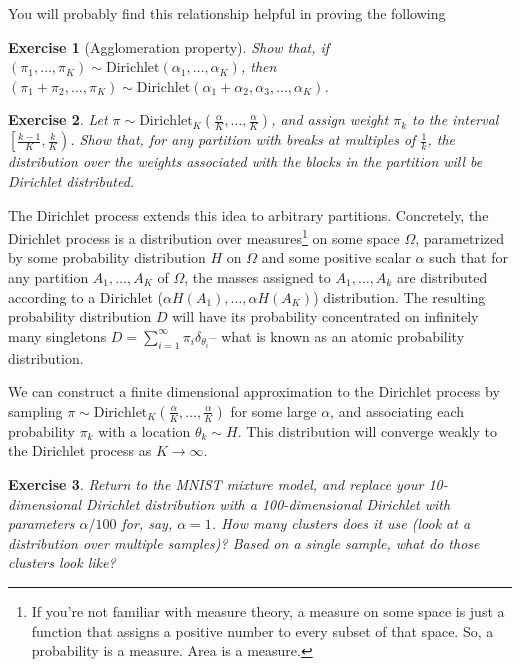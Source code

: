 \documentclass[twoside]{article}
\newcounter{lecnum}
\newtheorem{exercise}{Exercise}[lecnum]
\begin{document}
   You will probably find this relationship helpful in proving the following
   
   \begin{exercise}[Agglomeration property]
     Show that, if $(\pi_1,\dots, \pi_K) \sim \mbox{Dirichlet}(\alpha_1,\dots,\alpha_K)$, then $(\pi_1+\pi_2,\dots,\pi_K) \sim \mbox{Dirichlet}(\alpha_1+\alpha_2,\alpha_3,\dots,\alpha_K)$.
   \end{exercise}




   \begin{exercise}
     Let $\pi\sim \mbox{Dirichlet}_K\left(\frac{\alpha}{K},\dots,\frac{\alpha}{K}\right)$, and assign weight $\pi_k$ to the interval $\left[\frac{k-1}{K},\frac{k}{K}\right)$. Show that, for any partition with breaks at multiples of $\frac{1}{k}$, the distribution over the weights associated with the blocks in the partition will be Dirichlet distributed.
   \end{exercise}

   The Dirichlet process extends this idea to arbitrary partitions. Concretely, the Dirichlet process is a distribution over measures\footnote{If you're not familiar with measure theory, a measure on some space is just a function that assigns a positive number to every subset of that space. So, a probability is a measure. Area is a measure.} on some space $\mathcal{\Omega}$, parametrized by some probability distribution $H$ on $\Omega$ and some positive scalar $\alpha$ such that for any partition $A_1,\dots,A_K$ of $\Omega$, the masses assigned to $A_1,\dots, A_k$ are distributed according to a Dirichlet ($\alpha H(A_1),\dots, \alpha H(A_K)$) distribution. The resulting probability distribution $D$ will have its probability concentrated on infinitely many singletons $D=\sum_{i=1}^\infty \pi_i \delta_{\theta_i}$-- what is known as an atomic probability distribution.

   We can construct a finite dimensional approximation to the Dirichlet process by sampling $\pi\sim\mbox{Dirichlet}_K\left(\frac{\alpha}{K},\dots,\frac{\alpha}{K}\right)$ for some large $\alpha$, and associating each probability $\pi_k$ with a location $\theta_k\sim H$. This distribution will converge weakly to the Dirichlet process as $K\rightarrow \infty$.

   \begin{exercise}
     Return to the MNIST mixture model, and replace your 10-dimensional Dirichlet distribution with a 100-dimensional Dirichlet with parameters $\alpha/100$ for, say, $\alpha=1$. How many clusters does it use (look at a distribution over multiple samples)? Based on a single sample, what do those clusters look like?
   \end{exercise}

   
   
  
  
\end{document}
